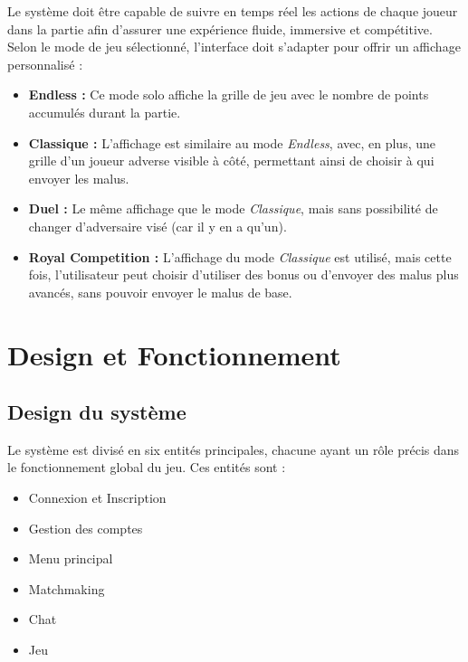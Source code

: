 \documentclass{report}
\begin{document}
\noindent Le système doit être capable de suivre en temps réel les actions de chaque joueur dans la partie afin d'assurer une expérience fluide, immersive et compétitive. Selon le mode de jeu sélectionné, l'interface doit s'adapter pour offrir un affichage personnalisé :

\begin{itemize}
    \item \textbf{Endless :} Ce mode solo affiche la grille de jeu avec le nombre de points accumulés durant la partie.
    \item \textbf{Classique :} L'affichage est similaire au mode \emph{Endless}, avec, en plus, une grille d'un joueur adverse visible à côté, permettant ainsi de choisir à qui envoyer les malus.
    \item \textbf{Duel :} Le même affichage que le mode \emph{Classique}, mais sans possibilité de changer d'adversaire visé (car il y en a qu'un).
    \item \textbf{Royal Competition :} L'affichage du mode \emph{Classique} est utilisé, mais cette fois, l'utilisateur peut choisir d'utiliser des bonus ou d'envoyer des malus plus avancés, sans pouvoir envoyer le malus de base.
\end{itemize}




\chapter{Design et Fonctionnement}
\label{chap:design}

\section*{Design du système}

\noindent Le système est divisé en six entités principales, chacune ayant un rôle précis dans le fonctionnement global du jeu. Ces entités sont :  
\begin{itemize}
    \item Connexion et Inscription
    \item Gestion des comptes
    \item Menu principal
    \item Matchmaking
    \item Chat
    \item Jeu
\end{itemize}
\end{document}
